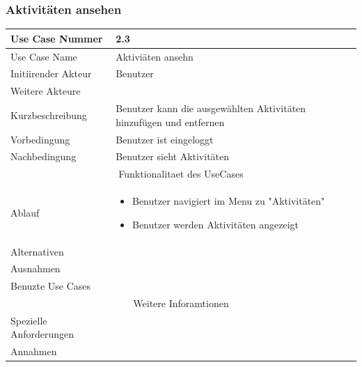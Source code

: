 \documentclass[10pt,a4paper]{article}
\begin{document}
\subsubsection{Aktivit\"aten ansehen}
		\begin{tabular}{|l|p{.5\linewidth}|}
		\hline Use Case Nummer & 2.3 \\ 
		\hline Use Case Name & Aktivi\"aten ansehn \\ 
		\hline Initiirender Akteur & Benutzer \\
		\hline Weitere Akteure &  \\
		\hline Kurzbeschreibung & Benutzer kann die ausgew\"ahlten Aktivit\"aten hinzuf\"ugen und entfernen \\
		\hline Vorbedingung & Benutzer ist eingeloggt \\
		\hline Nachbedingung & Benutzer sieht Aktivit\"aten \\
		\hline \multicolumn{2}{|c|}{Funktionalitaet des UseCases}\\
		\hline Ablauf & \begin{itemize}
			\item Benutzer navigiert im Menu zu "Aktivit\"aten"
			\item Benutzer werden Aktivit\"aten angezeigt
		\end{itemize} \\
		\hline Alternativen &  \\
		\hline Ausnahmen &  \\
		\hline Benuzte Use Cases &  \\
		\hline \multicolumn{2}{|c|}{Weitere Inforamtionen} \\
		\hline Spezielle Anforderungen &  \\
		\hline Annahmen &  \\
		\hline
		\end{tabular}
\end{document}
